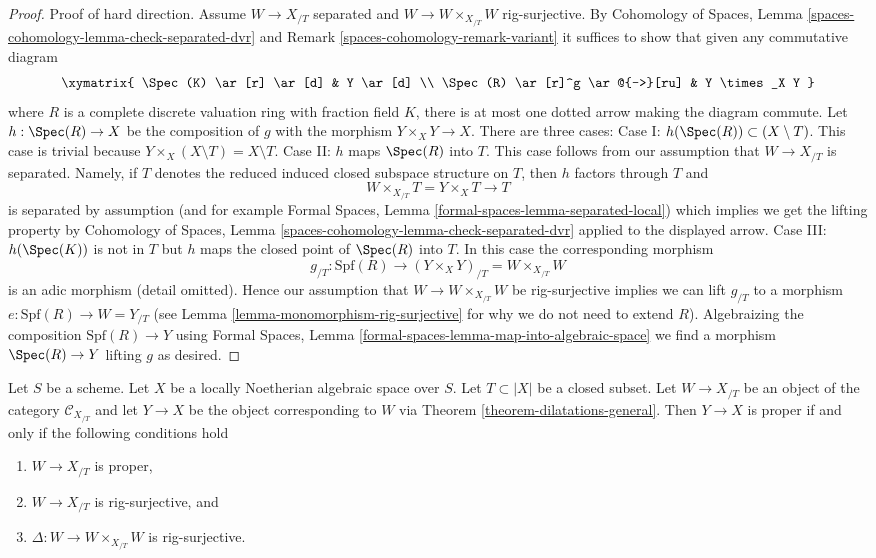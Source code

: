 \begin{proof}
\medskip\noindent
Proof of hard direction. Assume $W \to X_{/T}$ separated and
$W \to W \times_{X_{/T}} W$ rig-surjective. By
Cohomology of Spaces, Lemma
\ref{spaces-cohomology-lemma-check-separated-dvr} and
Remark \ref{spaces-cohomology-remark-variant}
it suffices to show that given any commutative diagram
$$
\xymatrix{
\Spec(K) \ar[r] \ar[d] & Y \ar[d] \\
\Spec(R) \ar[r]^g \ar@{-->}[ru] & Y \times_X Y
}
$$
where $R$ is a complete discrete valuation ring with fraction field $K$,
there is at most one dotted arrow making the diagram commute. Let
$h : \Spec(R) \to X$ be the composition of $g$ with the morphism
$Y \times_X Y \to X$. There are three cases:
Case I: $h(\Spec(R)) \subset (X \setminus T)$. This case is trivial
because $Y \times_X (X \setminus T) = X \setminus T$.
Case II: $h$ maps $\Spec(R)$ into $T$. This case follows
from our assumption that $W \to X_{/T}$ is separated. Namely,
if $T$ denotes the reduced induced closed subspace structure
on $T$, then $h$ factors through $T$ and
$$
W \times_{X_{/T}} T = Y \times_X T \longrightarrow T
$$
is separated by assumption (and for example
Formal Spaces, Lemma \ref{formal-spaces-lemma-separated-local})
which implies we get the lifting property by
Cohomology of Spaces, Lemma \ref{spaces-cohomology-lemma-check-separated-dvr}
applied to the displayed arrow. Case III: $h(\Spec(K))$ is not in $T$
but $h$ maps the closed point of $\Spec(R)$ into $T$. In this case
the corresponding morphism
$$
g_{/T} :
\text{Spf}(R)
\longrightarrow
(Y \times_X Y)_{/T} =
W \times_{X_{/T}} W
$$
is an adic morphism (detail omitted). Hence our assumption that
$W \to W \times_{X_{/T}} W$ be rig-surjective implies we can lift
$g_{/T}$ to a morphism $e : \text{Spf}(R) \to W = Y_{/T}$ (see
Lemma \ref{lemma-monomorphism-rig-surjective}
for why we do not need to extend $R$).
Algebraizing the composition $\text{Spf}(R) \to Y$ using
Formal Spaces, Lemma \ref{formal-spaces-lemma-map-into-algebraic-space}
we find a morphism $\Spec(R) \to Y$ lifting $g$ as desired.
\end{proof}

\begin{lemma}
\label{lemma-output-proper}
Let $S$ be a scheme. Let $X$ be a locally Noetherian algebraic space over $S$.
Let $T \subset |X|$ be a closed subset. Let $W \to X_{/T}$ be an object
of the category $\mathcal{C}_{X_{/T}}$ and let $Y \to X$ be the object
corresponding to $W$ via Theorem \ref{theorem-dilatations-general}.
Then $Y \to X$ is proper if and only if the following conditions hold
\begin{enumerate}
\item $W \to X_{/T}$ is proper,
\item $W \to X_{/T}$ is rig-surjective, and
\item $\Delta : W \to W \times_{X_{/T}} W$ is rig-surjective.
\end{enumerate}
\end{lemma}

